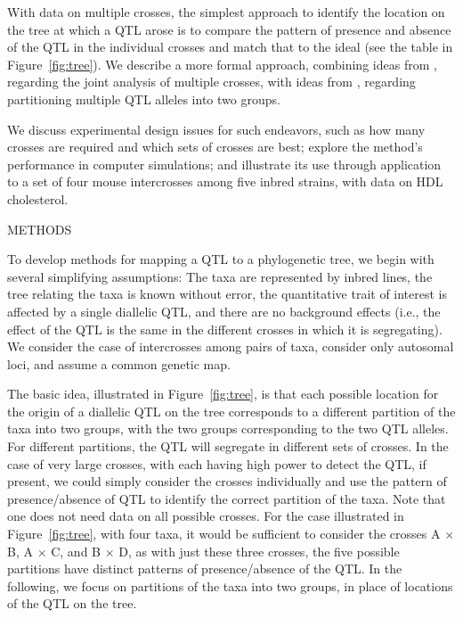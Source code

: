 \documentclass[12pt,letterpaper]{article}
\begin{document}
With data on multiple crosses, the simplest approach to identify the
location on the tree at which a QTL arose is to compare the pattern of
presence and absence of the QTL in the individual crosses and match
that to the ideal (see the table in Figure~\ref{fig:tree}).  We describe
a more formal approach, combining ideas from 
\citet{Li2005}, regarding the joint analysis of multiple crosses, with
ideas from \citet{MacdonaldLong2007}, regarding partitioning
multiple QTL alleles into two groups.

We discuss experimental design issues for such endeavors,
such as how many crosses are required and which sets of crosses are
best; explore the method's performance in computer simulations; and
illustrate its use through application to a set of four mouse
intercrosses among five inbred strains, with data on HDL cholesterol.



\clearpage

\centerline{METHODS}

To develop methods for mapping a QTL to a phylogenetic
tree, we begin with several simplifying assumptions: The taxa are
represented by inbred lines, the tree relating the taxa is known
without error,
the quantitative trait of interest is affected by a single
diallelic QTL, and there are no background effects (i.e., 
the effect of the QTL is the same in the different crosses in which it
is segregating).  We consider the case of intercrosses among
pairs of taxa, consider only autosomal loci, and assume a common
genetic map.

The basic idea, illustrated in Figure~\ref{fig:tree}, is that each
possible location for the origin of a diallelic QTL on the tree
corresponds to a different partition of the taxa into two groups, with
the two groups corresponding to the two QTL alleles.  For different
partitions, the QTL will segregate in different sets of crosses.
In the case of very large crosses, with each having high power to
detect the QTL, if present, we could simply consider the crosses
individually and use the pattern of presence/absence of QTL to
identify the correct partition of the taxa.  Note that one does
not need data on all possible crosses.  For the case illustrated in
Figure~\ref{fig:tree}, with four taxa, it would be sufficient to
consider the crosses A $\times$ B, A $\times$ C, and B $\times$ D, as
with just these three crosses, the five possible partitions have
distinct patterns of presence/absence of the QTL.  In the following,
we focus on partitions of the taxa into two groups, in place of
locations of the QTL on the tree.
\end{document}
